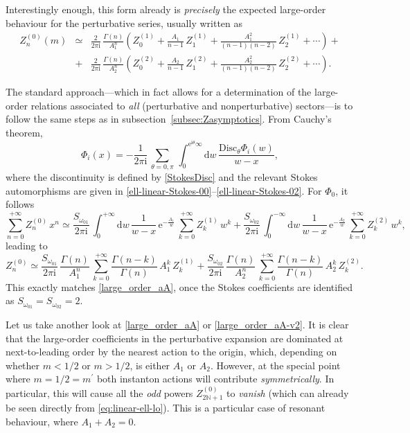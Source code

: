 \documentclass[11pt,a4paper]{article}
\def\BN{{\mathbb N}}
\newcommand{\be}{\begin{equation}}
\newcommand{\ee}{\end{equation}}
\def\disc{{\mathrm{Disc}}}
\newcommand{\rme}{{\mathrm{e}}}
\newcommand{\rmi}{{\mathrm{i}}}
\newcommand{\rmd}{{\mathrm{d}}}
\begin{document}
%
\noindent
Interestingly enough, this form already is \textit{precisely} the expected large-order behaviour for the perturbative series, usually written as
%
\begin{eqnarray}
Z^{(0)}_n (m) &\simeq& \frac{2}{2\pi\rmi}\, \frac{\Gamma\left(n\right)}{A_1^n} \left( Z^{(1)}_0 + \frac{A_1}{n-1}\, Z^{(1)}_1 + \frac{A_1^2}{\left(n-1\right) \left(n-2\right)}\, Z^{(1)}_2 + \cdots \right) + \nonumber \\
&+& \frac{2}{2\pi\rmi}\, \frac{\Gamma\left(n\right)}{A_2^n} \left( Z^{(2)}_0 + \frac{A_2}{n-1}\, Z^{(2)}_1 + \frac{A_2^2}{\left(n-1\right) \left(n-2\right)}\, Z^{(2)}_2 + \cdots \right). 
\label{large_order_aA}
\end{eqnarray}

The standard approach---which in fact allows for a determination of the large-order relations associated to \textit{all} (perturbative and nonperturbative) sectors---is to follow the same steps as in subsection~\ref{subsec:Zasymptotics}. From Cauchy's theorem, 
%
\be
\Phi_i (x) = -\frac{1}{2\pi\rmi}\, \sum_{\theta=0,\pi}\, \int_0^{\rme^{\rmi\theta} \infty} \rmd w\, \frac{\disc_\theta \Phi_i(w)}{w-x},
\ee
%
\noindent
where the discontinuity is defined by \eqref{StokesDisc} and the relevant Stokes automorphisms are given in \eqref{ell-linear-Stokes-00}--\eqref{ell-linear-Stokes-02}. For $\Phi_0$, it follows
%
\be
\sum_{n=0}^{+\infty} Z^{(0)}_n\, x^n \simeq \frac{S_{\omega_{01}}}{2\pi\mathrm{i}}\, \int_0^{+\infty} \mathrm{d}w\, \frac{1}{w-x}\, \mathrm{e}^{-\frac{A_1}{w}}\, \sum_{k=0}^{+\infty} Z^{(1)}_k\, w^k + \frac{S_{\omega_{02}}}{2\pi\mathrm{i}}\, \int_0^{-\infty} \mathrm{d}w\, \frac{1}{w-x}\, \mathrm{e}^{-\frac{A_2}{w}}\, \sum_{k=0}^{+\infty}Z^{(2)}_k\,w^k,
\ee
%
\noindent
leading to
%
\be
\label{large_order_aA-v2}
Z^{(0)}_n \simeq \frac{S_{\omega_{01}}}{2\pi\mathrm{i}}\, \frac{\Gamma\left(n\right)}{A_1^n}\, \sum_{k=0}^{+\infty} \frac{\Gamma\left(n-k\right)}{\Gamma\left(n\right)}\, A_1^k\, Z^{(1)}_k + \frac{S_{\omega_{02}}}{2\pi\mathrm{i}}\, \frac{\Gamma\left(n\right)}{A_2^n}\, \sum_{k=0}^{+\infty} \frac{\Gamma\left(n-k\right)}{\Gamma\left(n\right)}\, A_2^k\, Z^{(2)}_k.
\ee
%
\noindent
This exactly matches \eqref{large_order_aA}, once the Stokes coefficients are identified as $S_{\omega_{01}}=S_{\omega_{02}}=2$.

Let us take another look at \eqref{large_order_aA} or \eqref{large_order_aA-v2}. It is clear that the large-order coefficients in the perturbative expansion are dominated at next-to-leading order by the nearest action to the origin, which, depending on whether $m<1/2$ or $m>1/2$, is either $A_1$ or $A_2$. However, at the special point where $m=1/2=m^\prime$ both instanton actions will contribute \textit{symmetrically}. In particular, this will cause all the \textit{odd} powers $Z^{(0)}_{2\BN+1}$ to \textit{vanish} (which can already be seen directly from \eqref{eq:linear-ell-lo}). This is a particular case of resonant behaviour, where $A_1+A_2=0$.
\end{document}
